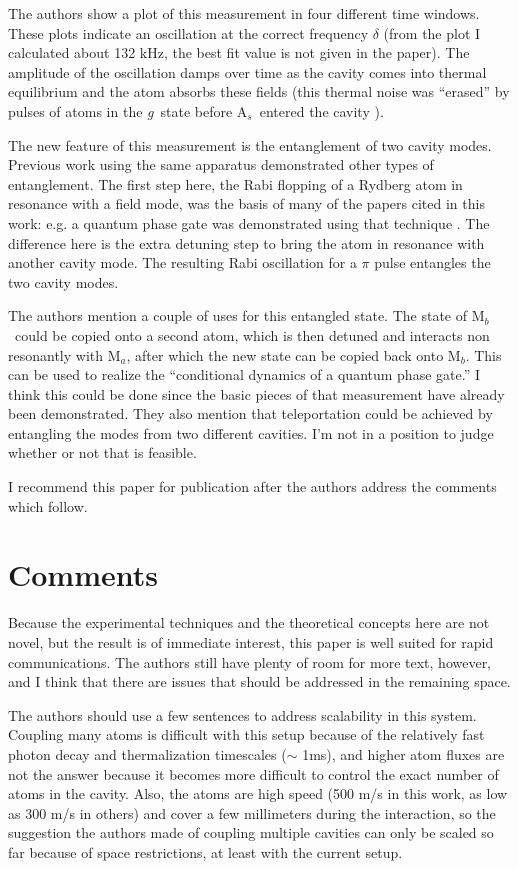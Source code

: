 \documentclass[12pt]{article}
\newcommand{\As}{A$_s$}
\newcommand{\Ma}{M$_a$}
\newcommand{\Mb}{M$_b$}
\newcommand{\gs}{{\it g}}
\begin{document}
The authors show a plot of this measurement in four different
time windows. These plots indicate an oscillation at the correct frequency 
$\delta$ (from the plot I calculated about 132 kHz,  the best fit value
is not given in the paper). 
The amplitude of the oscillation damps over time as the cavity comes
into thermal equilibrium and the atom absorbs these fields
(this thermal noise was ``erased'' by pulses of atoms in the \gs\ state 
before \As\ entered the cavity \cite{nogues99}).

The new feature of this measurement is the entanglement of two cavity
modes. Previous work using the same apparatus demonstrated other types
of entanglement. The first step
here, the Rabi flopping of a Rydberg atom in resonance with
a field mode, was the
basis of many of the papers cited in this work:
e.g. a quantum phase gate was demonstrated using that technique
\cite{rauch99}.
The difference here is the extra detuning step to bring the atom in resonance
with another cavity mode. The resulting Rabi oscillation for a $\pi$ pulse
entangles the two cavity modes. 

The authors mention a couple of uses for this entangled state. The state
of \Mb\ could be copied onto a second atom, which is then detuned
and interacts non resonantly with \Ma, after which the new 
state can be copied back onto \Mb. This can be used to realize the ``conditional
dynamics of a quantum phase gate.''
I think this could be done since the basic pieces of that measurement have
already been demonstrated.
They also mention that teleportation
could be achieved by entangling the modes from two different cavities. 
I'm not in a position to judge whether or not that is feasible.

I recommend this paper for publication
after the authors address the comments which follow.

\section*{Comments}
Because the experimental techniques and the theoretical concepts here 
are not novel, but the result is of immediate interest, this paper is well
suited for rapid communications. The authors still have plenty of
room for more text, however, and I think that there are issues that 
should be addressed in the remaining space.

The authors
should use a few sentences to address scalability in this system.
Coupling many atoms is difficult with
this setup because of the relatively fast photon decay and
thermalization timescales ($\sim$ 1ms), and higher
atom fluxes are not the answer because it becomes more difficult
to control the exact number of atoms in the cavity. 
Also, the atoms are high speed (500 m/s in this work, as low as 300 m/s in others) 
and cover a few millimeters during the interaction, 
so the suggestion
the authors made of coupling multiple cavities can only be scaled so far because of
space restrictions, at least with the current setup. 
\end{document}
